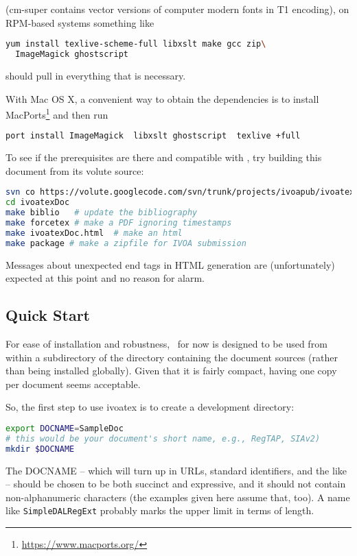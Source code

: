 \documentclass[11pt,a4paper]{ivoa}
\begin{document}
(cm-super contains vector versions of computer modern fonts in T1
encoding), on RPM-based systems something like

\begin{lstlisting}[language=sh]
yum install texlive-scheme-full libxslt make gcc zip\
  ImageMagick ghostscript
\end{lstlisting}

should pull in everything that is necessary.

With Mac OS X, a convenient way to obtain the dependencies is to install
MacPorts\footnote{\url{https://www.macports.org/}} and then run

\begin{lstlisting}[language=sh]
port install ImageMagick  libxslt ghostscript  texlive +full
\end{lstlisting}

To see if the prerequisites are there and compatible with \ivoatex, try
building this document from its volute source:

\begin{lstlisting}[language=sh]
svn co https://volute.googlecode.com/svn/trunk/projects/ivoapub/ivoatexDoc
cd ivoatexDoc
make biblio   # update the bibliography
make forcetex # make a PDF ignoring timestamps
make ivoatexDoc.html  # make an html
make package # make a zipfile for IVOA submission
\end{lstlisting}

Messages about unexpected end tags in HTML generation are
(unfortunately) expected at this point and no reason for alarm.

\subsection{Quick Start}

For ease of installation and robustness, \ivoatex\ for now is designed
to be used from within a subdirectory of the directory containing the
document sources (rather than being installed globally).  Given that
it is fairly compact, having one copy per document seems acceptable.

So, the first step to use ivoatex is to create a development
directory:

\begin{lstlisting}[language=sh]
export DOCNAME=SampleDoc
# this would be your document's short name, e.g., RegTAP, SIAv2)
mkdir $DOCNAME
\end{lstlisting}

The DOCNAME -- which will turn up in URLs, standard identifiers, and the
like -- should be chosen to be both succinct and expressive, and it
should not contain non-alphanumeric characters (the examples given here
assume that, too).  A name
like \texttt{SimpleDALRegExt} probably marks the upper limit in terms of
length.
\end{document}
